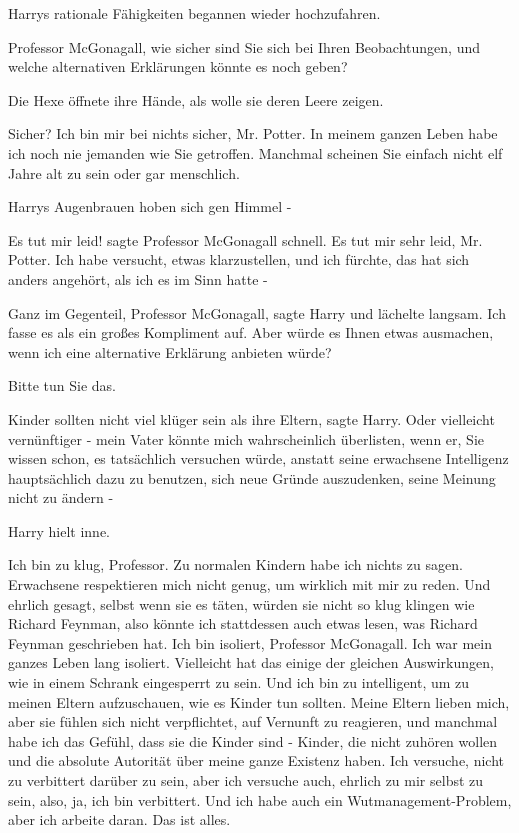 Harrys rationale Fähigkeiten begannen wieder hochzufahren.

\glqq{}Professor McGonagall, wie sicher sind Sie sich bei Ihren Beobachtungen,
und welche alternativen Erklärungen könnte es noch geben?\grqq{}

Die Hexe öffnete ihre Hände, als wolle sie deren Leere zeigen.

\glqq{}Sicher? Ich bin mir bei nichts sicher, Mr. Potter. In meinem ganzen Leben
habe ich noch nie jemanden wie Sie getroffen. Manchmal scheinen Sie einfach
nicht elf Jahre alt zu sein oder gar menschlich.\grqq{}

Harrys Augenbrauen hoben sich gen Himmel -

\glqq{}Es tut mir leid!\grqq{} sagte Professor McGonagall schnell. \glqq{}Es tut
mir sehr leid, Mr. Potter. Ich habe versucht, etwas klarzustellen, und ich
fürchte, das hat sich anders angehört, als ich es im Sinn hatte -\grqq{}

\glqq{}Ganz im Gegenteil, Professor McGonagall\grqq{}, sagte Harry und lächelte
langsam. \glqq{}Ich fasse es als ein großes Kompliment auf. Aber würde es Ihnen
etwas ausmachen, wenn ich eine alternative Erklärung anbieten würde?\grqq{}

\glqq{}Bitte tun Sie das.\grqq{}

\glqq{}Kinder sollten nicht viel klüger sein als ihre Eltern\grqq{}, sagte Harry.
\glqq{}Oder vielleicht vernünftiger - mein Vater könnte mich wahrscheinlich
überlisten, wenn er, Sie wissen schon, es tatsächlich versuchen würde, anstatt
seine erwachsene Intelligenz hauptsächlich dazu zu benutzen, sich neue Gründe
auszudenken, seine Meinung nicht zu ändern -\grqq{}

Harry hielt inne.

\glqq{}Ich bin zu klug, Professor. Zu normalen Kindern habe ich nichts zu sagen.
Erwachsene respektieren mich nicht genug, um wirklich mit mir zu reden. Und
ehrlich gesagt, selbst wenn sie es täten, würden sie nicht so klug klingen wie
Richard Feynman, also könnte ich stattdessen auch etwas lesen, was Richard
Feynman geschrieben hat. Ich bin isoliert, Professor McGonagall. Ich war mein
ganzes Leben lang isoliert. Vielleicht hat das einige der gleichen Auswirkungen,
wie in einem Schrank eingesperrt zu sein. Und ich bin zu intelligent, um zu
meinen Eltern aufzuschauen, wie es Kinder tun sollten. Meine Eltern lieben mich,
aber sie fühlen sich nicht verpflichtet, auf Vernunft zu reagieren, und manchmal
habe ich das Gefühl, dass sie die Kinder sind - Kinder, die nicht zuhören wollen
und die absolute Autorität über meine ganze Existenz haben. Ich versuche, nicht
zu verbittert darüber zu sein, aber ich versuche auch, ehrlich zu mir selbst zu
sein, also, ja, ich bin verbittert. Und ich habe auch ein Wutmanagement-Problem,
aber ich arbeite daran. Das ist alles.\grqq{}

